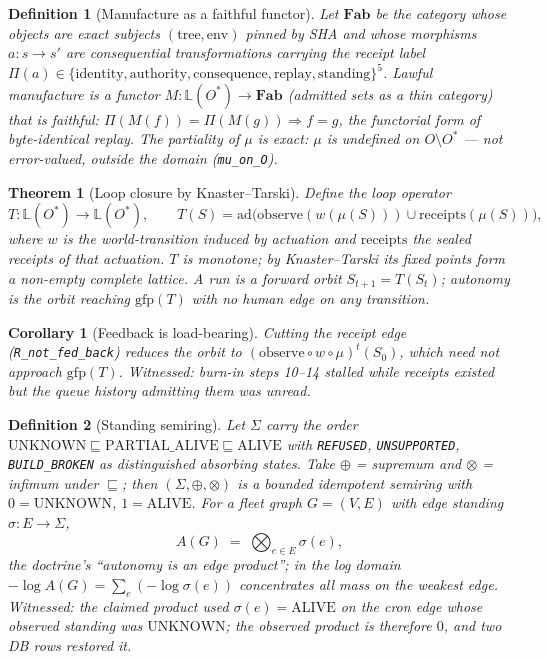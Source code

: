 \documentclass[11pt,a4paper]{article}
\newtheorem{definition}{Definition}
\newtheorem{theorem}{Theorem}
\newtheorem{corollary}{Corollary}
\theoremstyle{remark}
\newcommand{\term}[1]{\texttt{#1}}
\begin{document}
\begin{definition}[Manufacture as a faithful functor]\label{def:functor}
Let $\mathbf{Fab}$ be the category whose objects are exact subjects $(\mathrm{tree},\mathrm{env})$ pinned by SHA and whose morphisms $a\colon s \to s'$ are consequential transformations carrying the receipt label $\Pi(a) \in \{\mathrm{identity},\mathrm{authority},\mathrm{consequence},\mathrm{replay},\mathrm{standing}\}^{5}$. Lawful manufacture is a functor $M\colon \mathbb{L}(O^{*}) \to \mathbf{Fab}$ (admitted sets as a thin category) that is \emph{faithful}: $\Pi(M(f)) = \Pi(M(g)) \Rightarrow f = g$, the functorial form of byte-identical replay. The partiality of $\mu$ is exact: $\mu$ is \emph{undefined} on $O \setminus O^{*}$ --- not error-valued, outside the domain (\term{mu\_on\_O}).
\end{definition}

\begin{theorem}[Loop closure by Knaster--Tarski]\label{thm:closure}
Define the loop operator
\[
T \colon \mathbb{L}(O^{*}) \to \mathbb{L}(O^{*}), \qquad
T(S) = \mathrm{ad}\big(\mathrm{observe}(w(\mu(S))) \cup \mathrm{receipts}(\mu(S))\big),
\]
where $w$ is the world-transition induced by actuation and $\mathrm{receipts}$ the sealed receipts of that actuation. $T$ is monotone; by Knaster--Tarski its fixed points form a non-empty complete lattice. A run is a forward orbit $S_{t+1} = T(S_t)$; \emph{autonomy} is the orbit reaching $\mathrm{gfp}(T)$ with no human edge on any transition.
\end{theorem}
\begin{corollary}[Feedback is load-bearing]\label{cor:feedback}
Cutting the receipt edge (\term{R\_not\_fed\_back}) reduces the orbit to $(\mathrm{observe} \circ w \circ \mu)^{t}(S_0)$, which need not approach $\mathrm{gfp}(T)$. \emph{Witnessed}: burn-in steps 10--14 stalled while receipts existed but the queue history admitting them was unread.
\end{corollary}

\begin{definition}[Standing semiring]\label{def:semiring}
Let $\Sigma$ carry the order $\mathrm{UNKNOWN} \sqsubseteq \mathrm{PARTIAL\_ALIVE} \sqsubseteq \mathrm{ALIVE}$ with \term{REFUSED}, \term{UNSUPPORTED}, \term{BUILD\_BROKEN} as distinguished absorbing states. Take $\oplus$ = supremum and $\otimes$ = infimum under $\sqsubseteq$; then $(\Sigma, \oplus, \otimes)$ is a bounded idempotent semiring with $0 = \mathrm{UNKNOWN}$, $1 = \mathrm{ALIVE}$. For a fleet graph $G = (V,E)$ with edge standing $\sigma\colon E \to \Sigma$,
\[
A(G) \;=\; \bigotimes_{e \in E} \sigma(e),
\]
the doctrine's ``autonomy is an edge product''; in the log domain $-\log A(G) = \sum_{e}(-\log \sigma(e))$ concentrates all mass on the weakest edge. \emph{Witnessed}: the claimed product used $\sigma(e) = \mathrm{ALIVE}$ on the cron edge whose observed standing was $\mathrm{UNKNOWN}$; the observed product is therefore $0$, and two DB rows restored it.
\end{definition}
\end{document}
